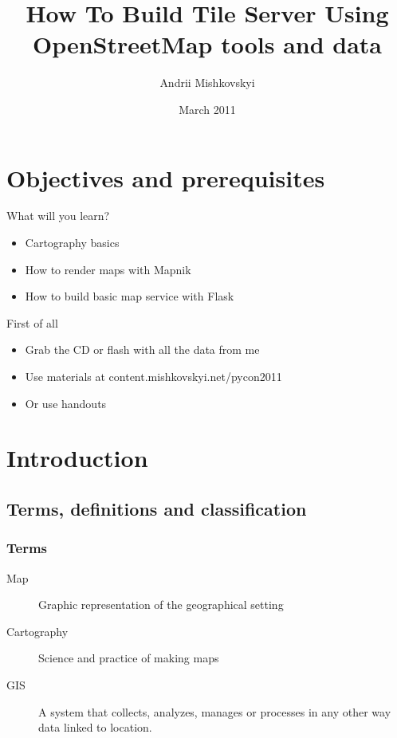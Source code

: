 \documentclass{beamer}
\begin{document}
\title{How To Build Tile Server Using OpenStreetMap tools and data}
\author{Andrii Mishkovskyi}
\date{March 2011}

\maketitle

\section{Objectives and prerequisites}

\begin{frame}{What will you learn?}
  \begin{itemize}
  \item Cartography basics
  \item How to render maps with Mapnik
  \item How to build basic map service with Flask
  \end{itemize}
\end{frame}

\begin{frame}{First of all}
  \begin{itemize}
  \item Grab the CD or flash with all the data from me
  \item Use materials at content.mishkovskyi.net/pycon2011
  \item Or use handouts
  \end{itemize}
\end{frame}

\section{Introduction}

\subsection{Terms, definitions and classification}

\begin{frame}
  \frametitle{Terms}
  \begin{description}
  \item[Map] Graphic representation of the geographical setting
  \item[Cartography] Science and practice of making maps
  \item[GIS] A system that collects, analyzes, manages or processes in any other way data linked to location.
  \end{description}
\end{frame}
\end{document}

